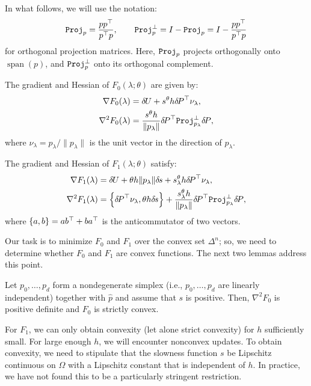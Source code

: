 \documentclass[smallcondensed]{svjour3}
\begin{document}
In what follows, we will use the notation:
\begin{equation}
  \mathtt{Proj}_p = \frac{p p^\top}{p^\top p}, \qquad \mathtt{Proj}_p^\perp = I - \mathtt{Proj}_p = I - \frac{p p^\top}{p^\top p}
\end{equation}
for orthogonal projection matrices. Here, $\mathtt{Proj}_p$ projects
orthogonally onto $\operatorname{span}(p)$, and $\mathtt{Proj}_p^\perp$ onto
its orthogonal complement.

\begin{proposition}\label{prop:F0-grad-and-Hess}
  The gradient and Hessian of $F_0(\lambda; \theta)$ are given by:
  \begin{align}
    \nabla F_0(\lambda) &= {\delta \hspace{-0.09em} U} + s^{\theta} h {\delta \hspace{-0.14em} P}^\top \nu_\lambda,\label{eq:F0-grad} \\
    \nabla^2 F_0(\lambda) &= \frac{s^{\theta} h}{\|p_\lambda\|} {\delta \hspace{-0.14em} P}^\top \mathtt{Proj}^\perp_{p_\lambda} {\delta \hspace{-0.14em} P},
  \end{align}
  where $\nu_\lambda = p_\lambda/\|p_\lambda\|$ is the unit vector in the
  direction of $p_\lambda$.
\end{proposition}

\begin{proposition}\label{prop:F1-grad-and-Hess}
  The gradient and Hessian of $F_1(\lambda; \theta)$ satisfy:
  \begin{align}
    \nabla F_1(\lambda) &= {\delta \hspace{-0.09em} U} + \theta h \|p_\lambda\| {\delta \hspace{-0.1em} s} + s^{\theta}_\lambda h {\delta \hspace{-0.14em} P}^\top \nu_\lambda, \\
    \nabla^2 F_1(\lambda) &= \left\{{\delta \hspace{-0.14em} P}^\top \nu_\lambda, \theta h {\delta \hspace{-0.1em} s}\right\} + \frac{s^\theta_\lambda h}{\|p_\lambda\|} {\delta \hspace{-0.14em} P}^\top \mathtt{Proj}^\perp_{p_\lambda} {\delta \hspace{-0.14em} P}, \label{eq:hess-F1}
  \end{align}
  where $\left\{a, b\right\} = ab^\top + ba^\top$ is the anticommutator of two
  vectors.
\end{proposition}

Our task is to minimize $F_0$ and $F_1$ over the convex set
$\Delta^n$; so, we need to determine whether $F_0$ and $F_1$ are
convex functions. The next two lemmas address this point.

\begin{lemma}\label{lemma:dPt-cprojp-dP-pd}
  Let $p_0, \hdots, p_d$ form a nondegenerate simplex (i.e.,
  $p_0, \hdots, p_d$ are linearly independent) together with $\hat{p}$
  and assume that $s$ is positive. Then, $\nabla^2 F_0$ is positive
  definite and $F_0$ is strictly convex.
\end{lemma}

For $F_1$, we can only obtain convexity (let alone strict convexity)
for $h$ sufficiently small. For large enough $h$, we will encounter
nonconvex updates. To obtain convexity, we need to stipulate that the
slowness function $s$ be Lipschitz continuous on $\Omega$ with a
Lipschitz constant that is independent of $h$. In practice, we have
not found this to be a particularly stringent restriction.
\end{document}
